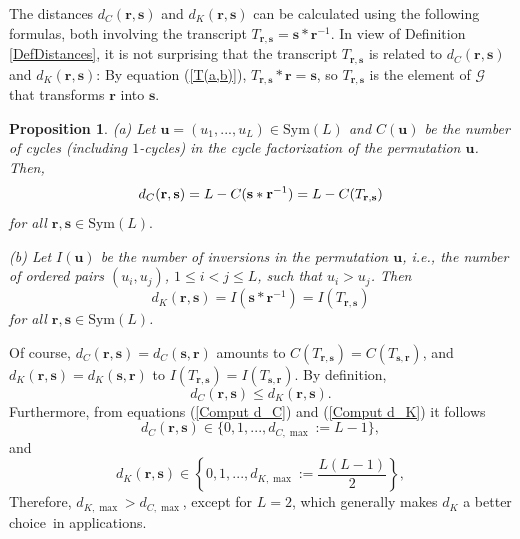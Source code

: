 \documentclass[%
 aip,
 amsmath,amssymb,
 reprint,%
]{revtex4-1}
\newtheorem{proposition}[theorem]{Proposition}
\begin{document}
The distances $d_{C}(\mathbf{r},\mathbf{s})$ and $d_{K}(\mathbf{r},\mathbf{s}%
)$ can be calculated using the following formulas, both involving the
transcript $T_{\mathbf{r},\mathbf{s}}=\mathbf{s}\ast \mathbf{r}^{-1}$. In
view of Definition \ref{DefDistances}, it is not surprising that the
transcript $T_{\mathbf{r},\mathbf{s}}$ is related to $d_{C}(\mathbf{r},%
\mathbf{s})$ and $d_{K}(\mathbf{r},\mathbf{s})$: By equation (\ref{T(a,b)}), 
$T_{\mathbf{r},\mathbf{s}}\ast \mathbf{r}=\mathbf{s}$, so $T_{\mathbf{r},%
\mathbf{s}}$ is the element of $\mathcal{G}$ that transforms $\mathbf{r}$
into $\mathbf{s}$.

\begin{proposition}
\label{PropComput dC dK}(a) Let $\mathbf{u}=(u_{1},...,u_{L})\in \mathrm{Sym}%
(L)$ and $C(\mathbf{u})$ be the number of cycles (including $1$-cycles) in
the cycle factorization of the permutation $\mathbf{u}$. Then,%
\begin{equation}
d_{C}(\mathbf{r},\mathbf{s})=L-C(\mathbf{s}\ast \mathbf{r}^{-1})=L-C(T_{%
\mathbf{r},\mathbf{s}})  \label{Comput d_C}
\end{equation}%
for all $\mathbf{r},\mathbf{s}\in \mathrm{Sym}(L).$

(b) Let $I(\mathbf{u})$ be the number of inversions in the permutation $%
\mathbf{u}$, i.e., the number of ordered pairs $(u_{i},u_{j})$, $1\leq
i<j\leq L$, such that $u_{i}>u_{j}$. Then%
\begin{equation}
d_{K}(\mathbf{r},\mathbf{s})=I(\mathbf{s}\ast \mathbf{r}^{-1})=I(T_{\mathbf{r%
},\mathbf{s}})  \label{Comput d_K}
\end{equation}%
for all $\mathbf{r},\mathbf{s}\in \mathrm{Sym}(L)$.
\end{proposition}

Of course, $d_{C}(\mathbf{r},\mathbf{s})=d_{C}(\mathbf{s},\mathbf{r})$
amounts to $C(T_{\mathbf{r},\mathbf{s}})=C(T_{\mathbf{s},\mathbf{r}})$, and $%
d_{K}(\mathbf{r},\mathbf{s})=d_{K}(\mathbf{s},\mathbf{r})$ to $I(T_{\mathbf{r%
},\mathbf{s}})=I(T_{\mathbf{s},\mathbf{r}})$. By definition,%
\begin{equation}
d_{C}(\mathbf{r},\mathbf{s})\leq d_{K}(\mathbf{r},\mathbf{s}).
\label{d_C <= d_K}
\end{equation}
Furthermore, from equations (\ref{Comput d_C}) and (\ref{Comput d_K}) it
follows 
\begin{equation}
d_{C}(\mathbf{r},\mathbf{s})\in \{0,1,...,d_{C,\max }:=L-1\},
\label{Range d_C}
\end{equation}%
and 
\begin{equation}
d_{K}(\mathbf{r},\mathbf{s})\in \left\{ 0,1,...,d_{K,\max }:=\frac{L(L-1)}{2}%
\right\} ,  \label{Range d_K}
\end{equation}%
Therefore, $d_{K,\max
}>d_{C,\max }$, except for $L=2$, which generally makes $d_{K}$ a better
choice\ in applications.
\end{document}
